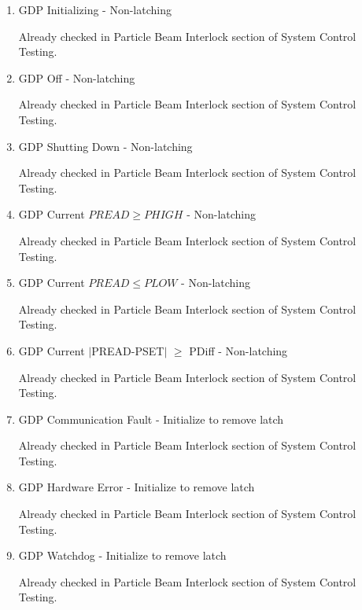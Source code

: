 \documentclass[11pt]{book}		%
\begin{document}
\begin{enumerate}
 \item GDP Initializing - Non-latching

\color{red}
Already checked in Particle Beam Interlock section of System Control Testing.
\color{black}

 \item GDP Off - Non-latching

\color{red}
Already checked in Particle Beam Interlock section of System Control Testing.
\color{black}

 \item GDP Shutting Down - Non-latching

\color{red}
Already checked in Particle Beam Interlock section of System Control Testing.
\color{black}

 \item GDP Current $PREAD \geq PHIGH$ - Non-latching

\color{red}
Already checked in Particle Beam Interlock section of System Control Testing.
\color{black}

 \item GDP Current $PREAD \leq PLOW$ - Non-latching

\color{red}
Already checked in Particle Beam Interlock section of System Control Testing.
\color{black}

 \item GDP Current $\mid$PREAD-PSET$\mid$  $\geq$ PDiff - Non-latching

\color{red}
Already checked in Particle Beam Interlock section of System Control Testing.
\color{black}

 \item GDP Communication Fault - Initialize to remove latch

\color{red}
Already checked in Particle Beam Interlock section of System Control Testing.
\color{black}

 \item GDP Hardware Error - Initialize to remove latch

\color{red}
Already checked in Particle Beam Interlock section of System Control Testing.
\color{black}

 \item GDP Watchdog - Initialize to remove latch

\color{red}
Already checked in Particle Beam Interlock section of System Control Testing.
\color{black}

\end{enumerate}
\end{document}
